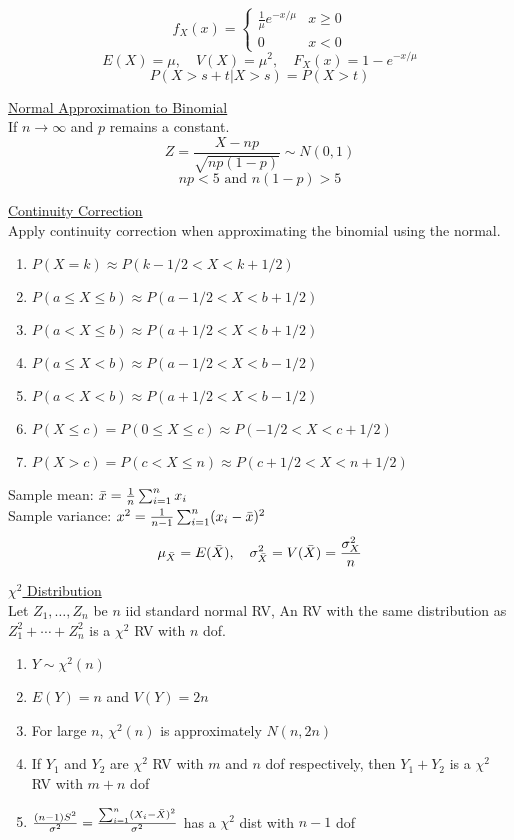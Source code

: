\documentclass[a4paper,1pt,landscape]{article}
\begin{document}
\begin{multicols}{3}
\begin{equation*}
f_X(x)=
    \begin{cases}
        \frac{1}{\mu}e^{-x/\mu} & x \geq 0\\
        0 & x < 0
    \end{cases}
\end{equation*}
$$E(X) = \mu, \quad V(X) = \mu^2, \quad F_X(x) = 1-e^{-x/\mu}$$
$$P(X>s+t|X>s) = P(X>t)$$

\underline{Normal Approximation to Binomial}\\
If $n \rightarrow \infty$ and $p$ remains a constant.
$$Z = \frac{X-np}{\sqrt{np(1-p)}} \sim N(0,1)$$
$$np < 5 \text{ and } n(1-p) > 5$$

\underline{Continuity Correction}\\
Apply continuity correction when approximating the binomial using the normal.
\begin{enumerate}
    \item $P(X=k) \approx P(k-1/2 < X < k + 1/2)$
    \item $P(a \leq X \leq b) \approx P(a-1/2 < X < b + 1/2)$
    \item $P(a < X \leq b) \approx P(a+1/2 < X < b + 1/2)$
    \item $P(a \leq X < b) \approx P(a-1/2 < X < b - 1/2)$
    \item $P(a < X < b) \approx P(a+1/2 < X < b - 1/2)$
    \item $P(X\leq c) = P(0 \leq X \leq c) \approx P(-1/2 < X < c + 1/2)$
    \item $P(X > c) = P(c < X \leq n) \approx P(c+1/2 < X < n + 1/2)$
\end{enumerate}

Sample mean: $\Bar{x} = \frac{1}{n}\sum_{i=1}^n x_i$\\
Sample variance: $x^2 = \frac{1}{n-1}\sum_{i=1}^n (x_i - \Bar{x})^2$\\
$$\mu_{\Bar{X}} = E(\Bar{X}), \quad \sigma_{\Bar{X}}^2 = V(\Bar{X}) = \frac{\sigma_X^2}{n}$$

\underline{$\chi^2$ Distribution}\\
Let $Z_1, \ldots, Z_n$ be $n$ iid standard normal RV, An RV with the same distribution as $Z_1^2 + \cdots + Z_n^2$ is a $\chi^2$ RV with $n$ dof.
\begin{enumerate}
    \item $Y\sim \chi^2(n)$
    \item $E(Y) = n$ and $V(Y) = 2n$
    \item For large $n$, $\chi^2(n)$ is approximately $N(n,2n)$
    \item If $Y_1$ and $Y_2$ are $\chi^2$ RV with $m$ and $n$ dof respectively, then $Y_1+Y_2$ is a $\chi^2$ RV with $m+n$ dof
    \item $\frac{(n-1)S^2}{\sigma^2} = \frac{\sum_{i=1}^n (X_i - \Bar{X})^2}{\sigma^2}$ has a $\chi^2$ dist with $n-1$ dof
\end{enumerate}


\end{multicols}
\end{document}
